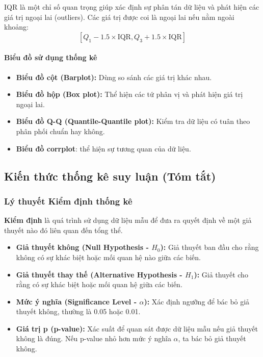 IQR là một chỉ số quan trọng giúp xác định sự phân tán dữ liệu và phát hiện các giá trị ngoại lai (outliers). Các giá trị được coi là ngoại lai nếu nằm ngoài khoảng:
\[
[Q_1 - 1.5 \times \text{IQR}, Q_3 + 1.5 \times \text{IQR}]
\]

\paragraph{Biểu đồ sử dụng thống kê}
\begin{itemize}
    \item \textbf{Biểu đồ cột (Barplot):} Dùng so sánh các giá trị khác nhau.
    \item \textbf{Biểu đồ hộp (Box plot):} Thể hiện các tứ phân vị và phát hiện giá trị ngoại lai.
    \item \textbf{Biểu đồ Q-Q (Quantile-Quantile plot):} Kiểm tra dữ liệu có tuân theo phân phối chuẩn hay không.
    \item \textbf{Biểu đồ corrplot}: thể hiện sự tương quan của dữ liệu. 
\end{itemize}

\subsection{Kiến thức thống kê suy luận (Tóm tắt)}
\subsubsection{Lý thuyết Kiểm định thống kê}
    \textbf{Kiểm định} là quá trình sử dụng dữ liệu mẫu để đưa ra quyết định về một giả thuyết nào đó liên quan đến tổng thể.
  \begin{itemize}
    \item \textbf{Giả thuyết không (Null Hypothesis - $H_0$):} Giả thuyết ban đầu cho rằng không có sự khác biệt hoặc mối quan hệ nào giữa các biến.
    \item \textbf{Giả thuyết thay thế (Alternative Hypothesis - $H_1$):} Giả thuyết cho rằng có sự khác biệt hoặc mối quan hệ giữa các biến.
    \item \textbf{Mức ý nghĩa (Significance Level - $\alpha$):} Xác định ngưỡng để bác bỏ giả thuyết không, thường là 0.05 hoặc 0.01.
    \item \textbf{Giá trị p (p-value):} Xác suất để quan sát được dữ liệu mẫu nếu giả thuyết không là đúng. Nếu p-value nhỏ hơn mức ý nghĩa $\alpha$, ta bác bỏ giả thuyết không.
  \end{itemize}

